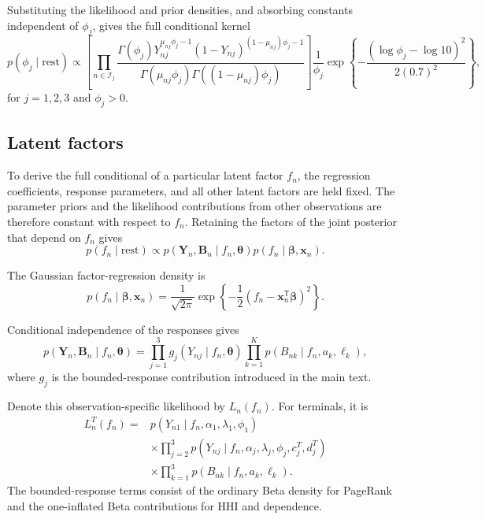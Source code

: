 \documentclass[pdftex,12pt,openright,a4paper,oneside]{book}
\begin{document}
Substituting the likelihood and prior densities,
and absorbing constants independent of $\phi_j$,
gives the full conditional kernel
\begin{equation*}
p(\phi_j\mid\mathrm{rest})
\propto
\left[
\prod_{n\in\mathcal{I}_j}
\frac{
\Gamma(\phi_j)
Y_{nj}^{\mu_{nj}\phi_j-1}
(1-Y_{nj})^{(1-\mu_{nj})\phi_j-1}
}{
\Gamma(\mu_{nj}\phi_j)
\Gamma((1-\mu_{nj})\phi_j)
}
\right]
\frac{1}{\phi_j}
\exp\!\left\{
-\frac{(\log\phi_j-\log 10)^2}{2(0.7)^2}
\right\},
\end{equation*}
for $j=1,2,3$ and $\phi_j>0$.

\subsection{Latent factors}
\label{app:factor_conditionals}

To derive the full conditional of a particular
latent factor $f_n$, the regression coefficients,
response parameters, and all other latent factors
are held fixed. The parameter priors and the
likelihood contributions from other observations
are therefore constant with respect to $f_n$.
Retaining the factors of the joint posterior
that depend on $f_n$ gives
\begin{equation*}
p(f_n\mid\mathrm{rest})
\propto
p(\mathbf{Y}_n,\mathbf{B}_n
\mid f_n,\boldsymbol{\theta})
p(f_n\mid\boldsymbol{\beta},\mathbf{x}_n).
\end{equation*}

The Gaussian factor-regression density is
\begin{equation*}
p(f_n\mid\boldsymbol{\beta},\mathbf{x}_n)
=
\frac{1}{\sqrt{2\pi}}
\exp\!\left\{
-\frac12
\left(
f_n-\mathbf{x}_n^{\mathsf T}\boldsymbol{\beta}
\right)^2
\right\}.
\end{equation*}

Conditional independence of the responses gives
\begin{equation*}
p(\mathbf{Y}_n,\mathbf{B}_n
\mid f_n,\boldsymbol{\theta})=
\prod_{j=1}^{3}
g_j(Y_{nj}\mid f_n,\boldsymbol{\theta})
\prod_{k=1}^{K}
p(B_{nk}\mid f_n,a_k,\ell_k),
\end{equation*}
where $g_j$ is the bounded-response contribution
introduced in the main text.

Denote this observation-specific likelihood by
$L_n(f_n)$. For terminals, it is
\begin{equation*}
\begin{aligned}
L_n^T(f_n)
={}&
p(Y_{n1}\mid f_n,\alpha_1,\lambda_1,\phi_1)
\\
&\times
\prod_{j=2}^{3}
p(Y_{nj}\mid
f_n,\alpha_j,\lambda_j,\phi_j,c_j^T,d_j^T)
\\
&\times
\prod_{k=1}^{3}
p(B_{nk}\mid f_n,a_k,\ell_k).
\end{aligned}
\end{equation*}
The bounded-response terms consist of the ordinary Beta
density for PageRank and the one-inflated Beta
contributions for HHI and dependence.
\end{document}
